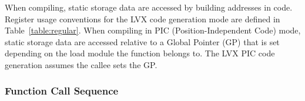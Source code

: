 When compiling, static storage data are accessed by building addresses in code.
Register usage conventions for the LVX code generation mode are defined in
Table~\ref{table:regular}. When compiling in PIC (Position-Independent Code)
mode, static storage data are accessed relative to a Global Pointer (GP) that is
set depending on the load module the function belongs to. The LVX PIC code
generation assumes the callee sets the GP.

\begin{table}
\begin{center}

\end{center}
\caption{Register usage conventions.}
\label{table:regular}
\end{table}

\subsubsection{Function Call Sequence}

